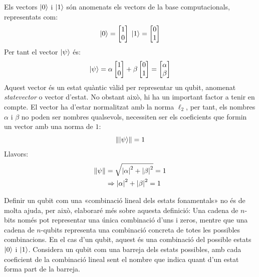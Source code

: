 Els vectors $\ket{0}$ i $\ket{1}$ són anomenats els vectors de la base computacionals, representats com:
$$
\ket{0} = \begin{bmatrix}
	1 \\ 0
\end{bmatrix} \;
\ket{1} = \begin{bmatrix}
	0 \\ 1
\end{bmatrix}
$$
Per tant el vector $\ket{\psi}$ és:
$$
\ket{\psi} 
= \alpha 
\begin{bmatrix}
	1 \\ 0
\end{bmatrix} + \beta 
\begin{bmatrix}
	0 \\ 1
\end{bmatrix}= 
\begin{bmatrix}
	\alpha \\ \beta
\end{bmatrix}
$$
Aquest vector és un estat quàntic vàlid per representar un qubit, anomenat \textit{statevector} o vector d'estat. No obstant això, hi ha un important factor a tenir en compte. El vector ha d'estar normalitzat amb la norma $\ell_2$, per tant, els nombres $\alpha$ i $\beta$ no poden ser nombres qualsevols, necessiten ser els coeficients que formin un vector amb una norma de $1$:
$$
\norm{\ket{\psi}} = 1 
$$
Llavors:
\begin{align*}
	\norm{\psi} &= \sqrt{\abs{\alpha}^2 + \abs{\beta}^2} = 1 \\
	&\Rightarrow \abs{\alpha}^2 + \abs{\beta}^2 = 1
\end{align*}

Definir un qubit com una «combinació lineal dels estats fonamentals» no és de molta ajuda, per això, elaboraré més sobre aquesta definició:
Una cadena de $n$-bits només pot representar una única combinació d'uns i zeros, mentre que una cadena de $n$-qubits representa una combinació concreta de totes les possibles combinacions. En el cas d'un qubit, aquest és una combinació del possible estats $\ket{0}$ i $\ket{1}$. Considera un qubit com una barreja dels estats possibles, amb cada coeficient de la combinació lineal sent el nombre que indica quant d'un estat forma part de la barreja. 

